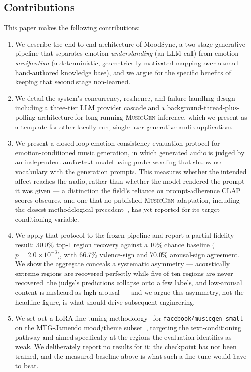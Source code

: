 \documentclass[11pt]{article}
\newcommand{\musicgen}{\textsc{MusicGen}}
\begin{document}
\subsection{Contributions}

This paper makes the following contributions:
\begin{enumerate}[leftmargin=*]
    \item We describe the end-to-end architecture of MoodSync, a two-stage generative pipeline that separates emotion \emph{understanding} (an LLM call) from emotion \emph{sonification} (a deterministic, geometrically motivated mapping over a small hand-authored knowledge base), and we argue for the specific benefits of keeping that second stage non-learned.
    \item We detail the system's concurrency, resilience, and failure-handling design, including a three-tier LLM provider cascade and a background-thread-plus-polling architecture for long-running \musicgen{} inference, which we present as a template for other locally-run, single-user generative-audio applications.
    \item We present a closed-loop emotion-consistency evaluation protocol for emotion-conditioned music generation, in which generated audio is judged by an independent audio-text model using probe wording that shares no vocabulary with the generation prompts. This measures whether the intended affect reaches the audio, rather than whether the model rendered the prompt it was given --- a distinction the field's reliance on prompt-adherence CLAP scores obscures, and one that no published \musicgen{} adaptation, including the closest methodological precedent~\cite{lee2026loramusicgen}, has yet reported for its target conditioning variable.
    \item We apply that protocol to the frozen pipeline and report a partial-fidelity result: 30.0\% top-1 region recovery against a 10\% chance baseline ($p = 2.0\times10^{-3}$), with 66.7\% valence-sign and 70.0\% arousal-sign agreement. We show the aggregate conceals a systematic asymmetry --- acoustically extreme regions are recovered perfectly while five of ten regions are never recovered, the judge's predictions collapse onto a few labels, and low-arousal content is misheard as high-arousal --- and we argue this asymmetry, not the headline figure, is what should drive subsequent engineering.
    \item We set out a LoRA fine-tuning methodology~\cite{hu2022lora} for \texttt{facebook/musicgen-small} on the MTG-Jamendo mood/theme subset~\cite{bogdanov2019jamendo}, targeting the text-conditioning pathway and aimed specifically at the regions the evaluation identifies as weak. We deliberately report no results for it: the checkpoint has not been trained, and the measured baseline above is what such a fine-tune would have to beat.
\end{enumerate}
\end{document}
